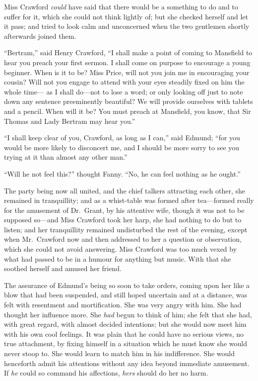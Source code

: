 Miss Crawford \emph{could} have said that there would
be a something to do and to suffer for it, which she
could not think lightly of; but she checked herself
and let it pass; and tried to look calm and unconcerned
when the two gentlemen shortly afterwards joined them.

``Bertram,'' said Henry Crawford, ``I shall make a point of
coming to Mansfield to hear you preach your first sermon.
I shall come on purpose to encourage a young beginner.
When is it to be?  Miss Price, will not you join me in
encouraging your cousin?  Will not you engage to attend
with your eyes steadily fixed on him the whole time---%
as I shall do---not to lose a word; or only looking off
just to note down any sentence preeminently beautiful?
We will provide ourselves with tablets and a pencil.
When will it be?  You must preach at Mansfield, you know,
that Sir Thomas and Lady Bertram may hear you.''

``I shall keep clear of you, Crawford, as long as I can,''
said Edmund; ``for you would be more likely to disconcert me,
and I should be more sorry to see you trying at it than
almost any other man.''

``Will he not feel this?'' thought Fanny.  ``No, he can feel
nothing as he ought.''

The party being now all united, and the chief talkers
attracting each other, she remained in tranquillity;
and as a whist-table was formed after tea---formed really
for the amusement of Dr.\ Grant, by his attentive wife,
though it was not to be supposed so---and Miss Crawford
took her harp, she had nothing to do but to listen;
and her tranquillity remained undisturbed the rest
of the evening, except when Mr.\ Crawford now and then
addressed to her a question or observation, which she
could not avoid answering.  Miss Crawford was too much
vexed by what had passed to be in a humour for anything
but music.  With that she soothed herself and amused
her friend.

The assurance of Edmund's being so soon to take orders,
coming upon her like a blow that had been suspended,
and still hoped uncertain and at a distance, was felt
with resentment and mortification.  She was very angry
with him.  She had thought her influence more.
She \emph{had} begun to think of him; she felt that she had,
with great regard, with almost decided intentions;
but she would now meet him with his own cool feelings.
It was plain that he could have no serious views, no true
attachment, by fixing himself in a situation which he must
know she would never stoop to.  She would learn to match
him in his indifference.  She would henceforth admit his
attentions without any idea beyond immediate amusement.
If \emph{he} could so command his affections, \emph{hers} should do her
no harm.



